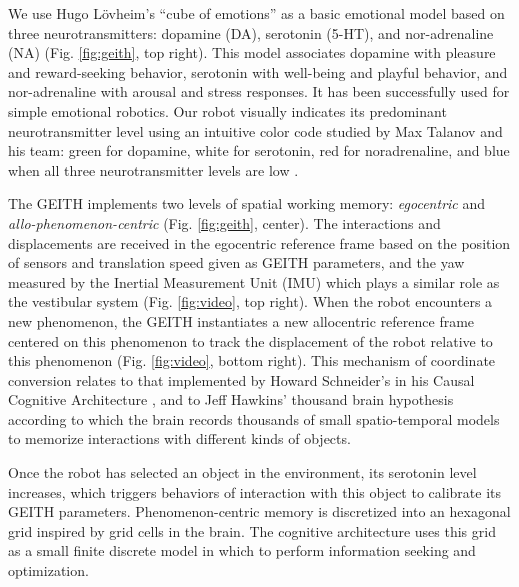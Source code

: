 \documentclass[runningheads]{llncs}
\begin{document}
We use Hugo Lövheim's ``cube of emotions'' \cite{lovheim_new_2012} as a basic emotional model based on three neurotransmitters: dopamine (DA), serotonin (5-HT), and nor-adrenaline (NA) (Fig. \ref{fig:geith}, top right).
This model associates dopamine with pleasure and reward-seeking behavior, serotonin with well-being and playful behavior, and nor-adrenaline with arousal and stress responses.
It has been successfully used for simple emotional robotics.
Our robot visually indicates its predominant neurotransmitter level using an intuitive color code studied by Max Talanov and his team: green for dopamine, white for serotonin, red for noradrenaline, and blue when all three neurotransmitter levels are low \cite{chebotareva_emotional_2019}.

The GEITH implements two levels of spatial working memory: \textit{egocentric} and \textit{allo-phenomenon-centric} (Fig. \ref{fig:geith}, center).  
The interactions and displacements are received in the egocentric reference frame based on the position of sensors and translation speed given as GEITH parameters, and the yaw measured by the Inertial Measurement Unit (IMU) which plays a similar role as the vestibular system %
(Fig. \ref{fig:video}, top right).
When the robot encounters a new phenomenon, the GEITH instantiates a new allocentric reference frame centered on this phenomenon to track the displacement of the robot relative to this phenomenon (Fig. \ref{fig:video}, bottom right). 
This mechanism of coordinate conversion relates to that implemented by Howard Schneider's in his Causal Cognitive Architecture \cite{schneider_emergence_2024}, and to 
Jeff Hawkins' thousand brain hypothesis \cite{hawkins_framework_2019} according to which the brain records thousands of small spatio-temporal models to memorize interactions with different kinds of objects.

Once the robot has selected an object in the environment, its serotonin level increases, which triggers behaviors of interaction with this object to calibrate its GEITH parameters. 
Phenomenon-centric memory is discretized into an hexagonal grid inspired by grid cells in the brain. 
The cognitive architecture uses this grid as a small finite discrete model in which to perform information seeking and optimization. %
\end{document}
